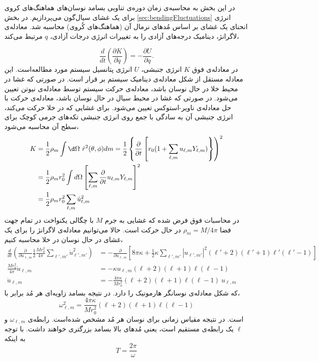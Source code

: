 
در این بخش به محاسبه‌ی زمان دوره‌ی تناوبی بسامد نوسان‌‌های هماهنگ‌های کروی برای یک غشای سیال‌گون می‌پردازیم. 
در بخش 
\ref{sec:bendingFluctuations}
انرژی انحنای یک غشای بر اساس مُدهای نرمال آن (هماهنگ‌های کُروی) محاسبه شد. معادله‌ی لاگرانژ، دینامیک درجه‌های آزادی را به تغییرات انرژی درجات آزادی، 
$q$
مرتبط می‌کند،

\begin{equation}
\frac{d}{dt}\left(\frac{\partial K}{\partial \dot q}\right)=-\frac{\partial U}{\partial q}.
\label{eq:LagrangeEquation}
\end{equation}
در معادله‌ی فوق
$K$
انرژی جنبشی،
$U$
انرژی پتانسیل سیستم مورد مطالعه‌است. این معادله مستقل از شکل معادله‌ی دینامیک سیستم بر قرار است. در صورتی که غشا در محیط خلا در حال نوسان باشد، معادله‌ی حرکت سیستم توسط معادله‌ی نیوتن تعیین می‌شود. در صورتی که غشا در محیط سیال در حال نوسان باشد، معادله‌ی حرکت با حل معادله‌ی ناویر-استوکس
تعیین می‌شود. برای غشایی که در خلا حرکت می‌کند، انرژی جنبشی آن به سادگی با جمع روی انرژی جنبشی تکه‌های جرمی کوچک برای سطح آن محاسبه می‌شود،
\begin{equation}
\begin{aligned}
K&=\frac{1}{2}\rho_m\int\d\Omega~\dot r^2(\theta,\phi) dm=\frac{1}{2} \left\{\frac{\partial}{\partial t}\left[r_0(1+\sum_{\ell,m}u_{\ell,m}Y_{\ell,m})\right\}\right)^2\\
&=\frac{1}{2} \rho_mr_0^2\int d\Omega\left[\sum_{\ell,m}\frac{\partial}{\partial t}u_{\ell,m}Y_{\ell,m}\right]^2\\
&=\frac{1}{2} \rho_mr_0^2\sum_{\ell,m}\dot u_{\ell,m}^2
\end{aligned}
\label{eq:kineticEnergyNewton}
\end{equation}
در محاسبات فوق فرض شده که غشایی به جرم 
$M$
با چگالی یکنواخت در تمام جهت فضا 
$\rho_m=M/4\pi$
در حال حرکت است. حالا می‌توانیم معادله‌ی لاگرانژ را برای یک غشای در حال نوسان در خلا محاسبه کنیم،
\begin{equation}
\begin{aligned}
\frac{d}{dt}\left(\frac{\partial}{\partial \dot u_{\ell,m}}\frac{1}{2}\frac{Mr_0^2}{4\pi}\sum_{\ell',m'}\dot u_{\ell',m'}^2\right)&=-\frac{\partial}{\partial u_{\ell,m}}\left[ 8\pi\kappa +\frac{1}{2}\kappa\sum_{\ell',m'}|u_{\ell',m'}|^2(\ell'+2)(\ell'+1)\ell'(\ell'-1)\right]\\
\frac{Mr_0^2}{4\pi}\ddot u_{\ell,m}&=-\kappa u_{\ell,m}(\ell+2)(\ell+1)\ell(\ell-1)\\
\ddot u_{\ell,m}&=-\frac{4\pi\kappa}{Mr_0^2}(\ell+2)(\ell+1)\ell(\ell-1)~u_{\ell,m}
\end{aligned}
\label{eq:LagrangeNewton}
\end{equation}
که شکل معادله‌ی نوسانگر هارمونیک را دارد. در نتیجه بسامد زاویه‌ای هر مُد برابر با،
\begin{equation}
\omega_{\ell,m}^2=\frac{4\pi\kappa}{Mr_0^2}(\ell+2)(\ell+1)\ell(\ell-1)
\label{eq:Omegalm}
\end{equation}
است. در نتیجه مقیاس زمانی برای نوسان هر مُد مشخص شده‌است. رابطه‌ی 
$\omega_{\ell,m}$
و
$\ell$
یک رابطه‌ی مستقیم است، یعنی مُدهای بالا بسامد بزرگتری خواهند داشت. با توجه به اینکه 
\begin{equation}
T=\frac{2\pi}{\omega}
\end{equation}

